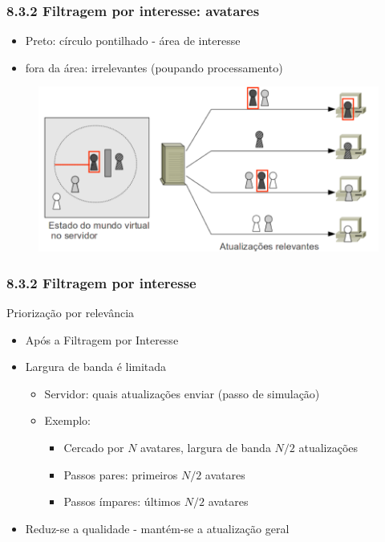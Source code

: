 \documentclass{beamer}
\begin{document}
\begin{frame} 
  \frametitle{8.3.2 Filtragem por interesse: avatares}
  \begin{itemize}
    \item Preto: círculo pontilhado - área de interesse
    \item fora da área: irrelevantes (poupando processamento)
  \end{itemize}
  \begin{figure}[h]
    \centering
    \vspace{-18pt}
    \includegraphics[width=1.03\textwidth]{imagem_82_Preto.png}
    \vspace{-20pt}
  \end{figure}
\end{frame}

\begin{frame}{}
  \frametitle{8.3.2 Filtragem por interesse}
  Priorização por relevância
    \begin{itemize}
      \item Após a Filtragem por Interesse
      \item Largura de banda é limitada
      \begin{itemize}
          \item Servidor: quais atualizações enviar (passo de simulação)
          \item Exemplo: 
          \begin{itemize}
              \item Cercado por $N$ avatares, largura de banda $N/2$ atualizações
              \item Passos pares: primeiros $N/2$ avatares
              \item Passos ímpares: últimos $N/2$ avatares
          \end{itemize}
      \end{itemize}
      \item Reduz-se a qualidade - mantém-se a atualização geral
    \end{itemize}
\end{frame}
\end{document}
